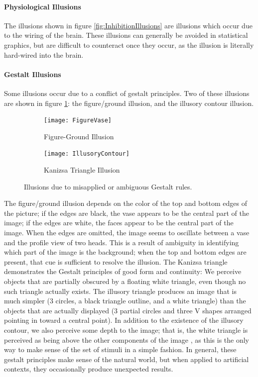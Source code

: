 \documentclass[11pt]{isuthesis}\usepackage[]{graphicx}\usepackage[]{color}
\begin{document}
\paragraph{Physiological Illusions} The illusions shown in figure \ref{fig:InhibitionIllusions} are illusions which occur due to the wiring of the brain. These illusions can generally be avoided in statistical graphics, but are difficult to counteract once they occur, as the illusion is literally hard-wired into the brain. 

\paragraph{Gestalt Illusions} Some illusions occur due to a conflict of gestalt principles. Two of these illusions are shown in figure \ref{fig:GestaltIllusions}: the figure/ground illusion, and the illusory contour illusion. 

\begin{figure}[htbp]\centering
\hfil
\begin{subfigure}[b]{.4\linewidth}\centering\vspace{.5cm}
  \texttt{[image: FigureVase]}\vspace{1cm}
  \caption{Figure-Ground Illusion}
\end{subfigure}\hfill
\begin{subfigure}[b]{.4\linewidth}\centering
  \texttt{[image: IllusoryContour]}
  \caption{Kanizsa Triangle Illusion}
\end{subfigure}\hfil
\caption[Gestalt Illusions]{Illusions due to misapplied or ambiguous Gestalt rules.}\label{fig:GestaltIllusions}
\end{figure}

The figure/ground illusion depends on the color of the top and bottom edges of the picture; if the edges are black, the vase appears to be the central part of the image; if the edges are white, the faces appear to be the central part of the image. When the edges are omitted, the image seems to oscillate between a vase and the profile view of two heads. This is a result of ambiguity in identifying which part of the image is the background; when the top and bottom edges are present, that cue is sufficient to resolve the illusion. The Kanizsa triangle demonstrates the Gestalt principles of good form and continuity: We perceive objects that are partially obscured by a floating white triangle, even though no such triangle actually exists. The illusory triangle produces an image that is much simpler (3 circles, a black triangle outline, and a white triangle) than the objects that are actually displayed (3 partial circles and three V shapes arranged pointing in toward a central point). In addition to the existence of the illusory contour, we also perceive some depth to the image; that is, the white triangle is perceived as being above the other components of the image \citep{coren1983subjective}, as this is the only way to make sense of the set of stimuli in a simple fashion. In general, these gestalt principles make sense of the natural world, but when applied to artificial contexts, they occasionally produce unexpected results. 
\end{document}
